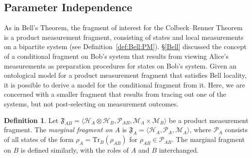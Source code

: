 \documentclass[DIV=calc,fontsize=12pt]{scrartcl} %
\theoremstyle{definition}
\newtheorem{definition}{Definition}[section]
\theoremstyle{plain}
\newcommand{\Hilb}[1][]{\ensuremath{\mathcal{H}_{#1}}}
\newcommand{\Tr}[2][]{\ensuremath{\text{Tr}_{#1} \left ( #2 \right )}}
\begin{document}
\subsection{Parameter Independence}

\label{CR:PI}

As in Bell's Theorem, the fragment of interest for the Colbeck--Renner
Theorem is a product measurement fragment, consisting of states and
local measurements on a bipartite system (see
Definition~\ref{def:Bell:PM}).  \S\ref{Bell} discussed the concept of
a conditional fragment on Bob's system that results from viewing
Alice's measurements as preparation procedures for states on Bob's
system.  Given an ontological model for a product measurement fragment
that satisfies Bell locality, it is possible to derive a model for the
conditional fragment from it.  Here, we are concerned with a smaller
fragment that results from tracing out one of the systems, but not
post-selecting on measurement outcomes.

\begin{definition}
Let $\mathfrak{F}_{AB} = \langle \Hilb[A] \otimes \Hilb[B],
\mathcal{P}_{AB}, \mathcal{M}_A \times \mathcal{M}_B \rangle$ be a
product measurement fragment.  The \emph{marginal fragment on $A$}
is $\mathfrak{F}_A = \langle \Hilb[A], \mathcal{P}_A, \mathcal{M}_A
\rangle$, where $\mathcal{P}_A$ consists of all states of the form
$\rho_A = \Tr[B]{\rho_{AB}}$ for $\rho_{AB} \in \mathcal{P}_{AB}$.
The marginal fragment on $B$ is defined similarly, with the roles
of $A$ and $B$ interchanged.
\end{definition}
\end{document}
